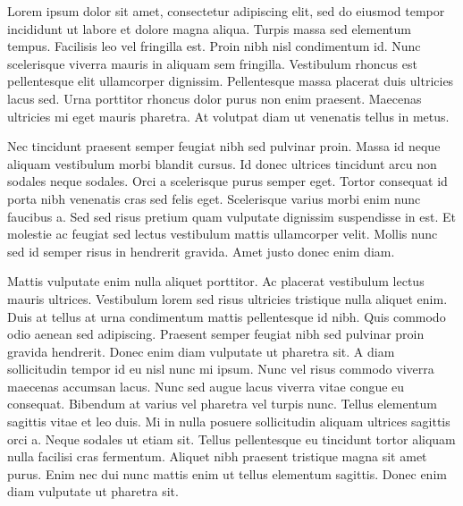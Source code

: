 
Lorem ipsum dolor sit amet, consectetur adipiscing elit, sed do eiusmod tempor incididunt ut labore et dolore magna aliqua. Turpis massa sed elementum tempus. Facilisis leo vel fringilla est. Proin nibh nisl condimentum id. Nunc scelerisque viverra mauris in aliquam sem fringilla. Vestibulum rhoncus est pellentesque elit ullamcorper dignissim. Pellentesque massa placerat duis ultricies lacus sed. Urna porttitor rhoncus dolor purus non enim praesent. Maecenas ultricies mi eget mauris pharetra. At volutpat diam ut venenatis tellus in metus.

Nec tincidunt praesent semper feugiat nibh sed pulvinar proin. Massa id neque aliquam vestibulum morbi blandit cursus. Id donec ultrices tincidunt arcu non sodales neque sodales. Orci a scelerisque purus semper eget. Tortor consequat id porta nibh venenatis cras sed felis eget. Scelerisque varius morbi enim nunc faucibus a. Sed sed risus pretium quam vulputate dignissim suspendisse in est. Et molestie ac feugiat sed lectus vestibulum mattis ullamcorper velit. Mollis nunc sed id semper risus in hendrerit gravida. Amet justo donec enim diam.

Mattis vulputate enim nulla aliquet porttitor. Ac placerat vestibulum lectus mauris ultrices. Vestibulum lorem sed risus ultricies tristique nulla aliquet enim. Duis at tellus at urna condimentum mattis pellentesque id nibh. Quis commodo odio aenean sed adipiscing. Praesent semper feugiat nibh sed pulvinar proin gravida hendrerit. Donec enim diam vulputate ut pharetra sit. A diam sollicitudin tempor id eu nisl nunc mi ipsum. Nunc vel risus commodo viverra maecenas accumsan lacus. Nunc sed augue lacus viverra vitae congue eu consequat. Bibendum at varius vel pharetra vel turpis nunc. Tellus elementum sagittis vitae et leo duis. Mi in nulla posuere sollicitudin aliquam ultrices sagittis orci a. Neque sodales ut etiam sit. Tellus pellentesque eu tincidunt tortor aliquam nulla facilisi cras fermentum. Aliquet nibh praesent tristique magna sit amet purus. Enim nec dui nunc mattis enim ut tellus elementum sagittis. Donec enim diam vulputate ut pharetra sit.



